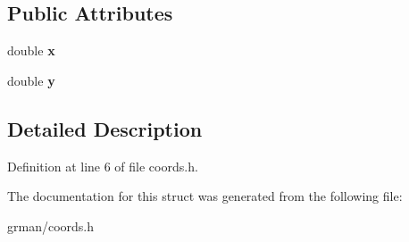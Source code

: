 \subsection*{Public Attributes}
\begin{DoxyCompactItemize}
\item 
\mbox{\label{struct_coords_a39be8f1e51668e2dcb4717e0d48b4622}} 
double {\bfseries x}
\item 
\mbox{\label{struct_coords_a657a9a238200f6fef66b4a491b7f86bc}} 
double {\bfseries y}
\end{DoxyCompactItemize}


\subsection{Detailed Description}


Definition at line 6 of file coords.\+h.



The documentation for this struct was generated from the following file\+:\begin{DoxyCompactItemize}
\item 
grman/coords.\+h\end{DoxyCompactItemize}

